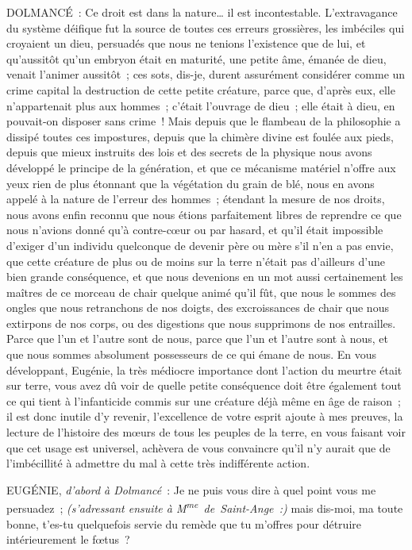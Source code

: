 \documentclass[french,twoside]{book} %
\begin{document}
DOLMANCÉ : Ce droit est dans la nature… il est incontestable. L’extravagance du système déifique fut la source de toutes ces erreurs grossières, les imbéciles qui croyaient un dieu, persuadés que nous ne tenions l’existence que de lui, et qu’aussitôt qu’un embryon était en maturité, une petite âme, émanée de dieu, venait l’animer aussitôt ; ces sots, dis-je, durent assurément considérer comme un crime capital la destruction de cette petite créature, parce que, d’après eux, elle n’appartenait plus aux hommes ; c’était l’ouvrage de dieu ; elle était à dieu, en pouvait-on disposer sans crime ! Mais depuis que le flambeau de la philosophie a dissipé toutes ces impostures, depuis que la chimère divine est foulée aux pieds, depuis que mieux instruits des lois et des secrets de la physique nous avons développé le principe de la génération, et que ce mécanisme matériel n’offre aux yeux rien de plus étonnant que la végétation du grain de blé, nous en avons appelé à la nature de l’erreur des hommes ; étendant la mesure de nos droits, nous avons enfin reconnu que nous étions parfaitement libres de reprendre ce que nous n’avions donné qu’à contre-cœur ou par hasard, et qu’il était impossible d’exiger d’un individu quelconque de devenir père ou mère s’il n’en a pas envie, que cette créature de plus ou de moins sur la terre n’était pas d’ailleurs d’une bien grande conséquence, et que nous devenions en un mot aussi certainement les maîtres de ce morceau de chair quelque animé qu’il fût, que nous le sommes des ongles que nous retranchons de nos doigts, des excroissances de chair que nous extirpons de nos corps, ou des digestions que nous supprimons de nos entrailles. Parce que l’un et l’autre sont de nous, parce que l’un et l’autre sont à nous, et que nous sommes absolument possesseurs de ce qui émane de nous. En vous développant, Eugénie, la très médiocre importance dont l’action du meurtre était sur terre, vous avez dû voir de quelle petite conséquence doit être également tout ce qui tient à l’infanticide commis sur une créature déjà même en âge de raison ; il est donc inutile d’y revenir, l’excellence de votre esprit ajoute à mes preuves, la lecture de l’histoire des mœurs de tous les peuples de la terre, en vous faisant voir que cet usage est universel, achèvera de vous convaincre qu’il n’y aurait que de l’imbécillité à admettre du mal à cette très indifférente action.\par
EUGÉNIE, {\itshape d’abord à Dolmancé} : Je ne puis vous dire à quel point vous me persuadez ; {\itshape (s’adressant ensuite à M\textsuperscript{me} de Saint-Ange :)} mais dis-moi, ma toute bonne, t’es-tu quelquefois servie du remède que tu m’offres pour détruire intérieurement le fœtus ?\par
\end{document}
